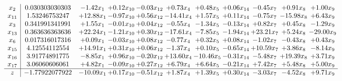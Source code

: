 \documentclass[9pt]{article}
\begin{document}
\[\begin{array}{c| c c@{\hskip 2pt} c@{\hskip 2pt} c@{\hskip 2pt} c@{\hskip 2pt} c@{\hskip 2pt} c@{\hskip 2pt} c@{\hskip 2pt} c@{\hskip 2pt} c@{\hskip 2pt} }
 x_{2}   &  0.030303030303 & -1.42 x_{1} & +  0.12 x_{10} & -0.03 x_{12} & +  0.73 x_{4} & +  0.48 x_{5} & +  0.06 x_{14} & -0.45 x_{7} & +  0.91 x_{8} & +  1.00 x_{9}\\
 x_{11}   &  1.53246753247 & + 12.88 x_{1} & -0.97 x_{10} & +  0.56 x_{12} & -14.41 x_{4} & +  1.57 x_{5} & +  0.11 x_{14} & -0.75 x_{7} & -15.98 x_{8} & +  6.43 x_{9}\\
 x_{3}   &  0.341991341991 & +  1.55 x_{1} & -0.01 x_{10} & +  0.04 x_{12} & -0.55 x_{4} & -1.34 x_{5} & -0.13 x_{14} & +  0.82 x_{7} & +  0.45 x_{8} & -1.29 x_{9}\\
 x_{13}   &  0.363636363636 & + 22.24 x_{1} & -1.21 x_{10} & +  0.30 x_{12} & -17.61 x_{4} & -7.85 x_{5} & -1.94 x_{14} & + 23.21 x_{7} & +  5.24 x_{8} & -29.00 x_{9}\\
 x_{6}   &  0.017316017316 & +  0.09 x_{1} & -0.03 x_{10} & +  0.08 x_{12} & -0.77 x_{4} & +  0.32 x_{5} & +  0.08 x_{14} & -1.02 x_{7} & -0.43 x_{8} & +  0.43 x_{9}\\
 x_{15}   &  4.12554112554 & + 14.91 x_{1} & +  0.31 x_{10} & +  0.06 x_{12} & -1.37 x_{4} & +  0.10 x_{5} & -0.65 x_{14} & + 10.59 x_{7} & +  3.86 x_{8} & -8.14 x_{9}\\
 x_{16}   &  3.91774891775 & -8.85 x_{1} & +  0.96 x_{10} & -0.20 x_{12} & + 13.60 x_{4} & -10.46 x_{5} & -0.31 x_{14} & -5.48 x_{7} & + 19.39 x_{8} & +  3.71 x_{9}\\
 x_{17}   &  3.06060606061 & +  4.82 x_{1} & -0.09 x_{10} & +  0.27 x_{12} & +  6.79 x_{4} & +  6.64 x_{5} & -0.21 x_{14} & +  7.42 x_{7} & +  5.48 x_{8} & +  5.00 x_{9}\\
\hline
z    &  -1.77922077922 & -10.09 x_{1} & +  0.17 x_{10} & -0.51 x_{12} & +  1.87 x_{4} & +  1.39 x_{5} & +  0.30 x_{14} & -3.03 x_{7} & -4.52 x_{8} & +  9.71 x_{9}\\
\end{array}\]
\end{document}
